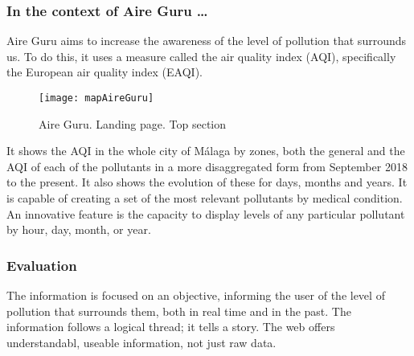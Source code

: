 \subsubsection*{In the context of Aire Guru \ldots} 

Aire Guru aims to increase the awareness of the level of pollution that surrounds us. To do this, it uses a measure called
the air quality index (AQI), specifically the European air quality index (EAQI).

\begin{figure}[ht]
    \centering
    \texttt{[image: mapAireGuru]}
    \caption{Aire Guru. Landing page. Top section}
\end{figure}

It shows the AQI in the whole city of Málaga by zones, both the general and the AQI of each of the 
pollutants in a more disaggregated form from September 2018 to the present. It also shows the evolution
of these for days, months and years.
It is capable of creating a set of the most relevant pollutants by medical condition. An innovative feature is the capacity to display levels of any particular pollutant by hour, day, month, or year. 

\subsubsection*{Evaluation}  

\begin{itemize}
    \done The information is focused on an objective, informing the user of the level of pollution that surrounds them, both  in real time
    and in the past.
    \done The information follows a logical thread; it tells a story.
    \done The web offers understandabl, useable information, not just raw data.
\end{itemize}